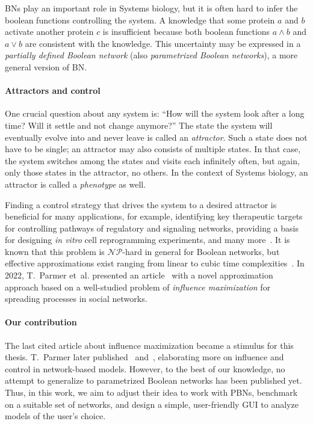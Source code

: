 \documentclass[
	digital, oneside, nosansbold, nocolorbold, nolot, nolof
]{fithesis4}
\theoremstyle{definition}
\theoremstyle{definition}
\begin{document}
BNs play an important role in Systems biology, but it is often hard to infer
the boolean functions controlling the system. A knowledge that some protein
\(a\) and \(b\) activate another protein \(c\) is insufficient because both
boolean functions \(a \land b\) and \(a \lor b\) are consistent with the
knowledge. This uncertainty may be expressed in a \emph{partially defined
Boolean network} (also \emph{parametrized Boolean networks}), a more general
version of BN.

\paragraph{Attractors and control}

One crucial question about any system is: \enquote{How will the system look
after a long time? Will it settle and not change anymore?} The state the system
will eventually evolve into and never leave is called an \emph{attractor}. Such
a state does not have to be single; an attractor may also consists of multiple
states. In that case, the system switches among the states and visits each
infinitely often, but again, only those states in the attractor, no others. In
the context of Systems biology, an attractor is called a \emph{phenotype} as
well.

Finding a control strategy that drives the system to a desired attractor is
beneficial for many applications, for example, identifying key therapeutic
targets for controlling pathways of regulatory and signaling networks,
providing a basis for designing \emph{in vitro} cell reprogramming experiments,
and many more~\cite{control_psbn}. It is known that this problem is
\(\mathcal{NP}\)-hard in general for Boolean networks, but effective
approximations exist ranging from linear to cubic time
complexities~\cite{control_akutsu}. In 2022, T.~Parmer et~al. presented an
article~\cite{infl_max_BN} with a novel approximation approach based on a
well-studied problem of \emph{influence maximization} for spreading processes
in social networks.

\paragraph{Our contribution}

The last cited article about influence maximization became a stimulus for this
thesis. T.~Parmer later published
\cite{parmer_dynamical}~and~\cite{parmer_phd}, elaborating more on influence
and control in network-based models. However, to the best of our knowledge, no
attempt to generalize to parametrized Boolean networks has been published yet.
Thus, in this work, we aim to adjust their idea to work with PBNs, benchmark on
a suitable set of networks, and design a simple, user-friendly GUI to analyze
models of the user's choice.
\end{document}
